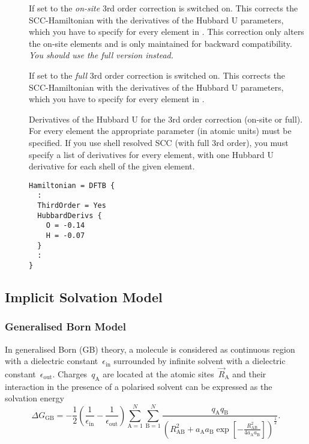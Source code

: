 \begin{description}

\item[] If set to  the \textit{on-site} 3rd order
  correction \cite{yang-JPCA-111-10861} is switched on. This corrects the
  SCC-Hamiltonian with the derivatives of the Hubbard U parameters, which you
  have to specify for every element in . This correction only
  alters the on-site elements and is only maintained for backward
  compatibility. \emph{You should use the full version 
    instead.}

\item[] If set to  the \textit{full} 3rd order
  correction \cite{gauss-jctc-7-931} is switched on. This corrects the
  SCC-Hamiltonian with the derivatives of the Hubbard U parameters, which you
  have to specify for every element in .

\item[] Derivatives of the Hubbard U for the 3rd order
  correction (on-site or full). For every element the appropriate parameter (in
  atomic units) must be specified. If you use shell resolved SCC (with full
  3rd order), you must specify a list of derivatives for every element, with one
  Hubbard U derivative for each shell of the given element.
\begin{verbatim}
Hamiltonian = DFTB {
  :
  ThirdOrder = Yes
  HubbardDerivs {
    O = -0.14
    H = -0.07
  }
  :
}
\end{verbatim}
\end{description}

\subsection{Implicit Solvation Model}
\label{sec:dftbp.Solvation}

\subsubsection{Generalised Born Model}
\label{sec:dftbp.GeneralisedBorn}

In generalised Born (GB) theory,\cite{onufriev2019} a molecule is considered as
continuous region with a dielectric constant~$\epsilon_\text{in}$ surrounded by
infinite solvent with a dielectric constant~$\epsilon_\text{out}$.
Charges~$q_\text{A}$ are located at the atomic sites~$\vec R_\text{A}$
and their interaction in the presence of a polarised solvent can be
expressed as the solvation energy
%
\begin{equation}
  \Delta G_\text{GB} =
  -\frac12 \left(\frac1{\epsilon_\text{in}}-\frac1{\epsilon_\text{out}}\right)
  \sum_{\text{A}=1}^N\sum_{\text{B}=1}^N\frac{q_\text{A}q_\text{B}}
  {\left(R^2_\text{AB} + a_\text{A}a_\text{B}\exp\left[-\frac{R^2_\text{AB}}
  {4a_\text{A}a_\text{B}}\right]\right)^{\frac12}}.
\end{equation}

